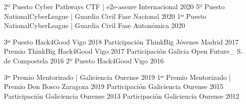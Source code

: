 \documentclass[11pt, a4paper]{style}
\begin{document}
\cvsubsection{\\\\Hacking}
\begin{cvhonors}
  \cvhonor
    {2º Puesto} %
    {Cyber Pathways CTF | e2e-assure} %
    {Internacional} %
    {2020} %
  \cvhonor
    {5º Puesto} %
    {NationalCyberLeague | Guardia Civil} %
    {Fase Nacional} %
    {2020} %
  \cvhonor
    {1ᵉʳ Puesto} %
    {NationalCyberLeague | Guardia Civil} %
    {Fase Autonómica} %
    {2020} %
\end{cvhonors}
\begin{cvhonors}
  \cvhonor
    {3ᵉʳ Puesto} %
    {Hack4Good} %
    {Vigo} %
    {2018} %
  \cvhonor
    {Participación} %
    {ThinkBig Jóvenes} %
    {Madrid} %
    {2017} %
  \cvhonor
    {Premio ThinkBig} %
    {Hack4Good} %
    {Vigo} %
    {2017} %
  \cvhonor
    {Participación} %
    {Galicia Open Future\_} %
    {S. de Compostela} %
    {2016} %
  \cvhonor
    {2º Puesto} %
    {Hack4Good} %
    {Vigo} %
    {2016} %
\end{cvhonors}
\begin{cvhonors}
  \cvhonor
    {3ᵉʳ Premio} %
    {Mentorizado | Galiciencia} %
    {Ourense} %
    {2019} %
  \cvhonor
    {1ᵉʳ Premio} %
    {Mentorizado | Premio Don Bosco} %
    {Zaragoza} %
    {2019} %
  \cvhonor
    {Participación} %
    {Galiciencia} %
    {Ourense} %
    {2015} %
  \cvhonor
    {Participación} %
    {Galiciencia} %
    {Ourense} %
    {2013} %
  \cvhonor
    {Participación} %
    {Galiciencia} %
    {Ourense} %
    {2012} %
\end{cvhonors}
\end{document}
